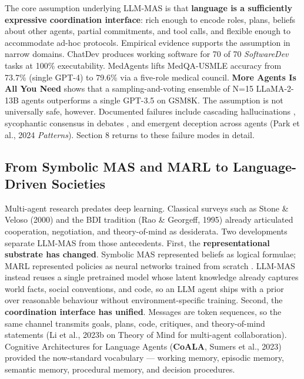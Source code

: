 \documentclass{article}
\begin{document}
The core assumption underlying LLM-MAS is that \textbf{language is a sufficiently expressive coordination interface}: rich enough to encode roles, plans, beliefs about other agents, partial commitments, and tool calls, and flexible enough to accommodate ad-hoc protocols. Empirical evidence supports the assumption in narrow domains. ChatDev produces working software for 70 of 70 \emph{SoftwareDev} tasks at 100\% executability. MedAgents lifts MedQA-USMLE accuracy from 73.7\% (single GPT-4) to 79.6\% via a five-role medical council. \textbf{More Agents Is All You Need} \citep{li2024asurveyonllmbasedm} shows that a sampling-and-voting ensemble of N=15 LLaMA-2-13B agents outperforms a single GPT-3.5 on GSM8K. The assumption is not universally safe, however. Documented failures include cascading hallucinations \citep{shi2024mitigatingreasonin}, sycophantic consensus in debates \citep{liang2024encouragingdiverge}, and emergent deception across agents (Park et al., 2024 \emph{Patterns}). Section 8 returns to these failure modes in detail.

\subsection{From Symbolic MAS and MARL to Language-Driven Societies}\label{from-symbolic-mas-and-marl-to-language-driven-societies}

Multi-agent research predates deep learning. Classical surveys such as Stone \& Veloso (2000) and the BDI tradition (Rao \& Georgeff, 1995) already articulated cooperation, negotiation, and theory-of-mind as desiderata. Two developments separate LLM-MAS from those antecedents. First, the \textbf{representational substrate has changed}. Symbolic MAS represented beliefs as logical formulae; MARL represented policies as neural networks trained from scratch \citep{zhu2022asurveyofmultiagen}. LLM-MAS instead reuses a single pretrained model whose latent knowledge already captures world facts, social conventions, and code, so an LLM agent ships with a prior over reasonable behaviour without environment-specific training. Second, the \textbf{coordination interface has unified}. Messages are token sequences, so the same channel transmits goals, plans, code, critiques, and theory-of-mind statements (Li et al., 2023b on Theory of Mind for multi-agent collaboration). Cognitive Architectures for Language Agents (\textbf{CoALA}, Sumers et al., 2023) provided the now-standard vocabulary --- working memory, episodic memory, semantic memory, procedural memory, and decision procedures.
\end{document}
